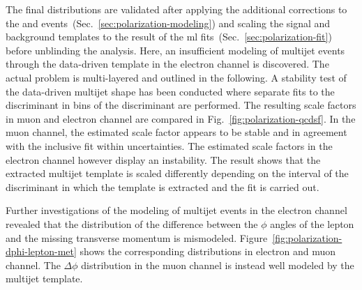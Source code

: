 The final distributions are validated after applying the additional corrections to the \wjets and \ttbar events~(Sec.~\ref{sec:polarization-modeling}) and scaling the signal and background templates to the result of the \gls{ml} fits~(Sec.~\ref{sec:polarization-fit}) before unblinding the analysis. Here, an insufficient modeling of multijet events through the data-driven template in the electron channel is discovered. The actual problem is multi-layered and outlined in the following. A stability test of the data-driven multijet shape has been conducted where separate fits to the \bdtqcd discriminant in bins of the \bdttch discriminant are performed. The resulting scale factors in muon and electron channel are compared in Fig.~\ref{fig:polarization-qcdsf}. In the muon channel, the estimated scale factor appears to be stable and in agreement with the inclusive fit within uncertainties. The estimated scale factors in the electron channel however display an instability. The result shows that the extracted multijet template is scaled differently depending on the interval of the \bdttch discriminant in which the template is extracted and the fit is carried out. 


Further investigations of the modeling of multijet events in the electron channel revealed that the distribution of the difference between the $\phi$ angles of the lepton and the missing transverse momentum is mismodeled. Figure~\ref{fig:polarization-dphi-lepton-met} shows the corresponding distributions in electron and muon channel. The $\Delta\phi$ distribution in the muon channel is instead well modeled by the multijet template.



